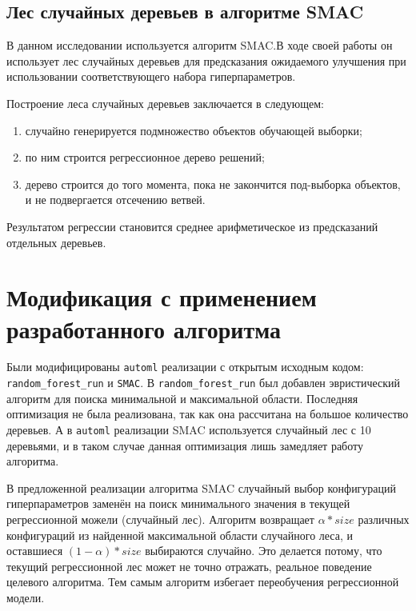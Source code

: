 \subsection{Лес случайных деревьев в алгоритме SMAC} 

В данном исследовании используется алгоритм SMAC.\@ В ходе своей работы он
использует лес случайных деревьев для предсказания ожидаемого улучшения при
использовании соответствующего набора гиперпараметров.

Построение леса случайных деревьев заключается в следующем: 

\begin{enumerate} 
    \item случайно генерируется подмножество объектов обучающей выборки; 
    \item по ним строится регрессионное дерево решений; 
    \item дерево строится до того момента, пока не закончится под-выборка
    объектов, и не подвергается отсечению ветвей. 
\end{enumerate}

Результатом регрессии становится среднее арифметическое из предсказаний
отдельных деревьев.

\section{Модификация с применением разработанного алгоритма}
    
Были модифицированы \texttt{automl} реализации с открытым исходным кодом:
\texttt{random\_forest\_run} и \texttt{SMAC}. В \texttt{random\_forest\_run} был
добавлен эвристический алгоритм для поиска минимальной и максимальной области.
Последняя оптимизация не была реализована, так как она рассчитана на большое
количество деревьев. А в \texttt{automl} реализации SMAC используется случайный
лес с 10 деревьями, и в таком случае данная оптимизация лишь замедляет работу
алгоритма.

В предложенной реализации алгоритма SMAC случайный выбор конфигураций
гиперпараметров заменён на поиск минимального значения в текущей регрессионной
можели (случайный лес). Алгоритм возвращает $\alpha * size$ различных
конфигураций из найденной максимальной области случайного леса, и оставшиеся $(1
- \alpha) * size$ выбираются случайно. Это делается потому, что текущий
регрессионной лес может не точно отражать, реальное поведение целевого
алгоритма. Тем самым алгоритм избегает переобучения регрессионной модели.

